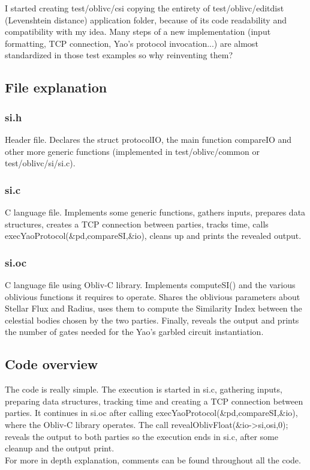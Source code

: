 \documentclass[a4paper]{article}
\begin{document}
I started creating test/oblivc/csi copying the entirety of test/oblivc/editdist (Levenshtein distance) application folder, because of its code readability and compatibility with my idea. Many steps of a new implementation (input formatting, TCP connection, Yao's protocol invocation...) are almost standardized in those test examples so why reinventing them? 

\subsection{File explanation}

\subsubsection{si.h}

Header file. Declares the struct protocolIO, the main function compareIO and other more generic functions (implemented in test/oblivc/common or test/oblivc/si/si.c).

\subsubsection{si.c}

C language file. Implements some generic functions, gathers inputs, prepares data structures, creates a TCP connection between parties, tracks time, calls execYaoProtocol(\&pd,compareSI,\&io), cleans up and prints the revealed output.

\subsubsection{si.oc}

C language file using Obliv-C library. Implements computeSI() and the various oblivious functions it requires to operate. Shares the oblivious parameters about Stellar Flux and Radius, uses them to compute the Similarity Index between the celestial bodies chosen by the two parties. Finally, reveals the output and prints the number of gates needed for the Yao's garbled circuit instantiation.

\subsection{Code overview}

The code is really simple. The execution is started in si.c, gathering inputs, preparing data structures, tracking time and creating a TCP connection between parties. It continues in si.oc after calling execYaoProtocol(\&pd,compareSI,\&io), where the Obliv-C library operates. The call revealOblivFloat(\&io->si,osi,0); reveals the output to both parties so the execution ends in si.c, after some cleanup and the output print. \\
For more in depth explanation, comments can be found throughout all the code.
\end{document}

